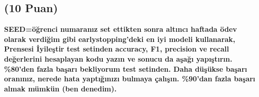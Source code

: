 \documentclass[11pt]{article}
\begin{document}

\subsection{(10 Puan)} \textbf{SEED=öğrenci numaranız set ettikten sonra altıncı haftada ödev olarak verdiğim gibi earlystopping'deki en iyi modeli kullanarak, Prensesi İyileştir test setinden accuracy, F1, precision ve recall değerlerini hesaplayan kodu yazın ve sonucu da aşağı yapıştırın. \%80'den fazla başarı bekliyorum test setinden. Daha düşükse başarı oranınız, nerede hata yaptığınızı bulmaya çalışın. \%90'dan fazla başarı almak mümkün (ben denedim).}
\end{document}
